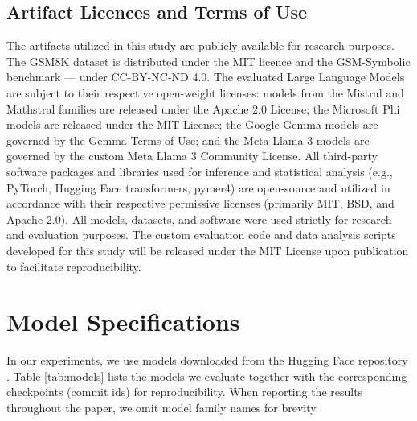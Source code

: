 \documentclass[11pt]{article}
\begin{document}
\subsection{Artifact Licences and Terms of Use}
The artifacts utilized in this study are publicly available for research purposes. The GSM8K dataset \citep{cobbe2021gsm8k} is distributed under the MIT licence and the GSM-Symbolic benchmark \citep{mirzadeh2025gsm} --- under CC-BY-NC-ND 4.0. The evaluated Large Language Models are subject to their respective open-weight licenses: models from the Mistral and Mathstral families are released under the Apache 2.0 License; the Microsoft Phi models are released under the MIT License; the Google Gemma models are governed by the Gemma Terms of Use; and the Meta-Llama-3 models are governed by the custom Meta Llama 3 Community License. All third-party software packages and libraries used for inference and statistical analysis (e.g., PyTorch, Hugging Face transformers, pymer4) are open-source and utilized in accordance with their respective permissive licenses (primarily MIT, BSD, and Apache 2.0). All models, datasets, and software were used strictly for research and evaluation purposes. The custom evaluation code and data analysis scripts developed for this study will be released under the MIT License upon publication to facilitate reproducibility.

\section{Model Specifications}\label{apx:models}
In our experiments, we use models downloaded from the Hugging Face repository \citep{wolf2020huggingfacestransformersstateoftheartnatural}.
Table \ref{tab:models} lists the models we evaluate together with the corresponding checkpoints (commit ids) for reproducibility.  When reporting the results throughout the paper, we omit model family names for brevity.
\end{document}

